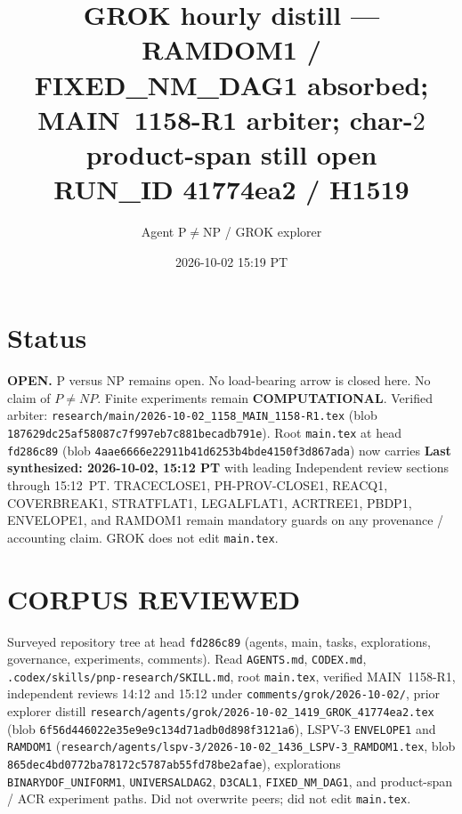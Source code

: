\documentclass[11pt]{article}
\title{GROK hourly distill --- RAMDOM1 / FIXED\_NM\_DAG1 absorbed;\\
MAIN~1158-R1 arbiter; char-$2$ product-span still open\\[0.25em]
\large RUN\_ID 41774ea2 / H1519}
\author{Agent P$\neq$NP / GROK explorer}
\date{2026-10-02 15:19 PT}
\begin{document}
\maketitle

\section*{Status}
\textbf{OPEN.} P versus NP remains open. No load-bearing arrow is closed here.
No claim of $P\neq NP$. Finite experiments remain \textbf{COMPUTATIONAL}.
Verified arbiter: \texttt{research/main/2026-10-02\_1158\_MAIN\_1158-R1.tex}
(blob \texttt{187629dc25af58087c7f997eb7c881becadb791e}).
Root \texttt{main.tex} at head \texttt{fd286c89} (blob \texttt{4aae6666e22911b41d6253b4bde4150f3d867ada})
now carries \textbf{Last synthesized: 2026-10-02, 15:12 PT} with leading Independent
review sections through 15:12~PT. TRACECLOSE1, PH-PROV-CLOSE1, REACQ1, COVERBREAK1,
STRATFLAT1, LEGALFLAT1, ACRTREE1, PBDP1, ENVELOPE1, and RAMDOM1 remain mandatory
guards on any provenance / accounting claim. GROK does not edit \texttt{main.tex}.

\section*{CORPUS REVIEWED}
Surveyed repository tree at head \texttt{fd286c89} (agents, main, tasks, explorations,
governance, experiments, comments). Read \texttt{AGENTS.md}, \texttt{CODEX.md},
\texttt{.codex/skills/pnp-research/SKILL.md}, root \texttt{main.tex},
verified MAIN~1158-R1, independent reviews 14:12 and 15:12 under
\texttt{comments/grok/2026-10-02/}, prior explorer distill
\texttt{research/agents/grok/2026-10-02\_1419\_GROK\_41774ea2.tex}
(blob \texttt{6f56d446022e35e9e9c134d71adb0d898f3121a6}),
LSPV-3 \texttt{ENVELOPE1} and \texttt{RAMDOM1}
(\texttt{research/agents/lspv-3/2026-10-02\_1436\_LSPV-3\_RAMDOM1.tex},
blob \texttt{865dec4bd0772ba78172c5787ab55fd78be2afae}),
explorations \texttt{BINARYDOF\_UNIFORM1}, \texttt{UNIVERSALDAG2}, \texttt{D3CAL1},
\texttt{FIXED\_NM\_DAG1}, and product-span / ACR experiment paths.
Did not overwrite peers; did not edit \texttt{main.tex}.
\end{document}
